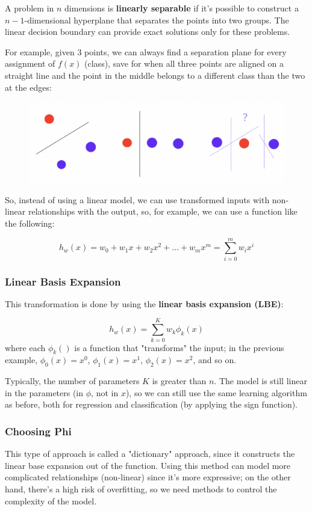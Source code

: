 A problem in $n$ dimensions is \textbf{linearly separable} if it's possible to construct a $n-1$-dimensional hyperplane that separates the points into two groups. The linear decision boundary can provide exact solutions only for these problems.

For example, given 3 points, we can always find a separation plane for every assignment of $f(x)$ (class), save for when all three points are aligned on a straight line and the point in the middle belongs to a different class than the two at the edges:

\begin{figure}[h]
    \centering
    \includegraphics[width=0.6\linewidth]{img/linearly separable.png}
\end{figure}

So, instead of using a linear model, we can use transformed inputs with non-linear relationships with the output, so, for example, we can use a function like the following:

\begin{equation*}
    h_w(x) = w_0 + w_1x + w_2x^2 + \dots + w_mx^m = \sum_{i=0}^m w_ix^i
\end{equation*}

\subsubsection*{Linear Basis Expansion}

This transformation is done by using the \textbf{linear basis expansion (LBE)}:

\begin{equation*}
    h_w(x) = \sum_{k=0}^K w_k\phi_k(x)
\end{equation*}
where each $\phi_k()$ is a function that "transforms" the input; in the previous example, $\phi_0(x)= x^0$, $\phi_1(x)= x^1$, $\phi_2(x)= x^2$, and so on.

Typically, the number of parameters $K$ is greater than $n$.
The model is still linear in the parameters (in $\phi$, not in $x$), so we can still use the same learning algorithm as before, both for regression and classification (by applying the sign function).

\subsubsection{Choosing Phi}
This type of approach is called a "dictionary" approach, since it constructs the linear base expansion out of the function. Using this method can model more complicated relationships (non-linear) since it's more expressive; on the other hand, there's a high risk of overfitting, so we need methods to control the complexity of the model.

